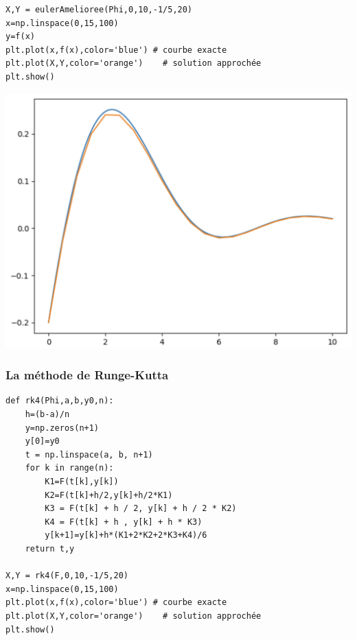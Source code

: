 \documentclass{beamer}
\begin{document}
\begin{frame}[fragile]
\begin{verbatim}
X,Y = eulerAmelioree(Phi,0,10,-1/5,20)
x=np.linspace(0,15,100)
y=f(x)
plt.plot(x,f(x),color='blue') # courbe exacte
plt.plot(X,Y,color='orange')    # solution approchée
plt.show()
\end{verbatim}

\begin{center}
\includegraphics[scale=0.35]{CaptureEquadiff05.png} 
\end{center}
 \end{frame}
 

\begin{frame}[fragile]
\frametitle{La méthode de Runge-Kutta}
\begin{verbatim}
def rk4(Phi,a,b,y0,n):
    h=(b-a)/n
    y=np.zeros(n+1)
    y[0]=y0
    t = np.linspace(a, b, n+1)
    for k in range(n):
        K1=F(t[k],y[k])
        K2=F(t[k]+h/2,y[k]+h/2*K1)
        K3 = F(t[k] + h / 2, y[k] + h / 2 * K2)
        K4 = F(t[k] + h , y[k] + h * K3)
        y[k+1]=y[k]+h*(K1+2*K2+2*K3+K4)/6
    return t,y

X,Y = rk4(F,0,10,-1/5,20)
x=np.linspace(0,15,100)
plt.plot(x,f(x),color='blue') # courbe exacte
plt.plot(X,Y,color='orange')    # solution approchée
plt.show()
\end{verbatim}
\end{frame}
 
\end{document}
